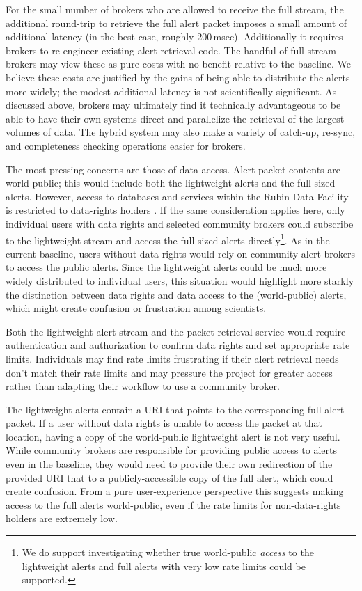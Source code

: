 \documentclass[DM,authoryear,toc]{lsstdoc}
\begin{document}
For the small number of brokers who are allowed to receive the full stream, the additional round-trip to retrieve the full alert packet imposes a small amount of additional latency (in the best case, roughly 200\,msec).
Additionally it requires brokers to re-engineer existing alert retrieval code.
The handful of full-stream brokers may view these as pure costs with no benefit relative to the baseline.
We believe these costs are justified by the gains of being able to distribute the alerts more widely; the modest additional latency is not scientifically significant.
As discussed above, brokers may ultimately find it technically advantageous to be able to have their own systems direct and parallelize the retrieval of the largest volumes of data.
The hybrid system may also make a variety of catch-up, re-sync, and completeness checking operations easier for brokers.

The most pressing concerns are those of data access.
Alert packet contents are world public; this would include both the lightweight alerts and the full-sized alerts.
However, access to databases and services within the Rubin Data Facility is restricted to data-rights holders .
If the same consideration applies here, only individual users with data rights and selected community brokers could subscribe to the lightweight stream and access the full-sized alerts directly\footnote{We do support investigating whether true world-public \textit{access} to the lightweight alerts and full alerts with very low rate limits could be supported.}.
As in the current baseline, users without data rights would rely on community alert brokers to access the public alerts.
Since the lightweight alerts could be much more widely distributed to individual users, this situation would highlight more starkly the distinction between data rights and data access to the (world-public) alerts, which might create confusion or frustration among scientists.

Both the lightweight alert stream and the packet retrieval service would require authentication and authorization to confirm data rights and set appropriate rate limits.
Individuals may find rate limits frustrating if their alert retrieval needs don't match their rate limits and may pressure the project for greater access rather than adapting their workflow to use a community broker.

The lightweight alerts contain a URI that points to the corresponding full alert packet.
If a user without data rights is unable to access the packet at that location, having a copy of the world-public lightweight alert is not very useful.
While community brokers are responsible for providing public access to alerts even in the baseline, they would need to provide their own redirection of the provided URI that to a publicly-accessible copy of the full alert, which could create confusion.
From a pure user-experience perspective this suggests making access to the full alerts world-public, even if the rate limits for non-data-rights holders are extremely low.
\end{document}

